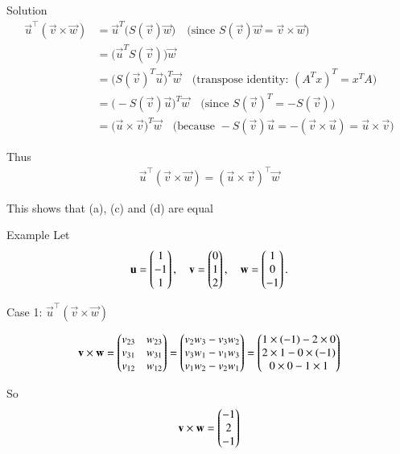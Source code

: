 \documentclass{beamer}
\begin{document}
\begin{frame}{Solution}
    \begin{align}
\vec{u}^\top(\vec{v}\times\vec{w})
&= \vec{u}^T\big(S(\vec{v})\vec{w}\big)
\quad\text{(since }S(\vec{v})\vec{w}=\vec{v}\times\vec{w}\text{)}\\ 
&= \big(\vec{u}^T S(\vec{v})\big)\vec{w} \\ 
&= \big(S(\vec{v})^T\vec{u}\big)^T\vec{w}
\quad\text{(transpose identity: }(A^T x)^T = x^T A\text{)}\\ 
&= \big(-S(\vec{v})\vec{u}\big)^T\vec{w}
\quad\text{(since }S(\vec{v})^T=-S(\vec{v})\text{)}\\ 
&= \big(\vec{u}\times\vec{v}\big)^T\vec{w}
\quad\text{(because }-S(\vec{v})\vec{u} = -(\vec{v}\times\vec{u}) = \vec{u}\times\vec{v})
\end{align}

Thus
\begin{align}
\vec{u}^\top(\vec{v}\times\vec{w}) = (\vec{u}\times\vec{v})^\top\vec{w}
\end{align}

This shows that (a), (c) and (d) are equal \\ 
\end{frame}

\begin{frame}{Example}
    Let
\begin{align}
\mathbf{u}=\begin{pmatrix}1 \\ -1 \\ 1\end{pmatrix}, \quad \mathbf{v}=\begin{pmatrix}0 \\ 1 \\ 2\end{pmatrix}, \quad \mathbf{w}=\begin{pmatrix}1 \\ 0 \\ -1\end{pmatrix}.
\end{align}

Case 1: $\vec{u} ^\top (\vec{v} \times \vec{w})$

\begin{align}
\mathbf{v} \times \mathbf{w} =
\begin{pmatrix}
v_{23} & w_{23} \\
v_{31} & w_{31} \\
v_{12} & w_{12}
\end{pmatrix}
=
\begin{pmatrix}
v_2 w_3 - v_3 w_2 \\
v_3 w_1 - v_1 w_3 \\
v_1 w_2 - v_2 w_1
\end{pmatrix}
=
\begin{pmatrix}
1 \times (-1) - 2 \times 0 \\
2 \times 1 - 0 \times (-1) \\
0 \times 0 - 1 \times 1
\end{pmatrix}
\end{align}


So
\begin{align}
\mathbf{v}\times \mathbf{w} = \begin{pmatrix}-1 \\ 2 \\ -1\end{pmatrix}
\end{align}
\end{frame}
\end{document}

